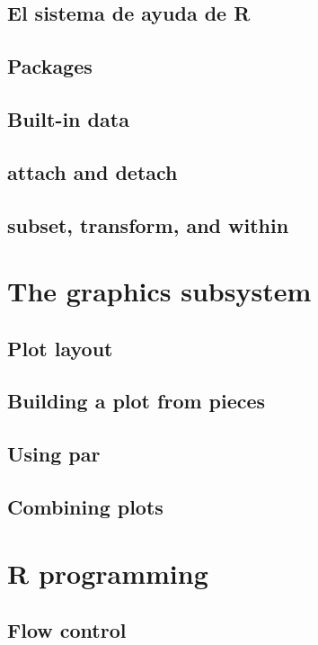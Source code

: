 \documentclass[spanish]{extbook}
\numberwithin{equation}{section}
\numberwithin{figure}{section}
\begin{document}
\subsection{El sistema de ayuda de R}

\newpage


\subsection{Packages}
\subsection{Built-in data}
\subsection{attach and detach}
\subsection{subset, transform, and within}

\section{The graphics subsystem}
\subsection{Plot layout}
\subsection{Building a plot from pieces}
\subsection{Using par}
\subsection{Combining plots}

\section{R programming}
\subsection{Flow control} \label{flowcontrol}
\end{document}
